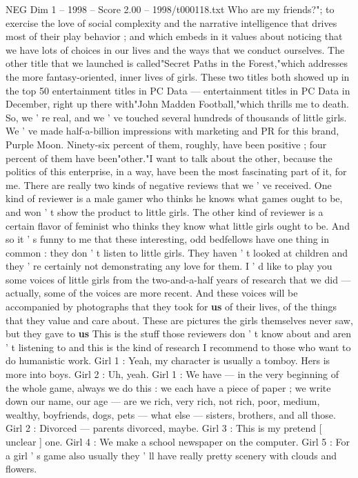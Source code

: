 \begin{textsample}{NEG Dim 1 – 1998 – Score 2.00 – 1998/t000118.txt}
Who are my friends?"; to exercise the love of social complexity and the narrative intelligence that drives most of their play behavior ; and which embeds in it values about noticing that we have lots of choices in our lives and the ways that we conduct ourselves.
The other title that we launched is called"Secret Paths in the Forest,"which addresses the more fantasy-oriented, inner lives of girls.
These two titles both showed up in the top 50 entertainment titles in PC Data — entertainment titles in PC Data in December, right up there with"John Madden Football,"which thrills me to death.
So, we ' re real, and we ' ve touched several hundreds of thousands of little girls.
We ' ve made half-a-billion impressions with marketing and PR for this brand, Purple Moon.
Ninety-six percent of them, roughly, have been positive ; four percent of them have been"other."I want to talk about the other, because the politics of this enterprise, in a way, have been the most fascinating part of it, for me.
There are really two kinds of negative reviews that we ' ve received.
One kind of reviewer is a male gamer who thinks he knows what games ought to be, and won ' t show the product to little girls.
The other kind of reviewer is a certain flavor of feminist who thinks they know what little girls ought to be.
And so it ' s funny to me that these interesting, odd bedfellows have one thing in common : they don ' t listen to little girls.
They haven ' t looked at children and they ' re certainly not demonstrating any love for them.
I ' d like to play you some voices of little girls from the two-and-a-half years of research that we did — actually, some of the voices are more recent.
And these voices will be accompanied by photographs that they took for \textbf{us} of their lives, of the things that they value and care about.
These are pictures the girls themselves never saw, but they gave to \textbf{us} This is the stuff those reviewers don ' t know about and aren ' t listening to and this is the kind of research I recommend to those who want to do humanistic work.
Girl 1 : Yeah, my character is usually a tomboy.
Hers is more into boys.
Girl 2 : Uh, yeah.
Girl 1 : We have — in the very beginning of the whole game, always we do this : we each have a piece of paper ; we write down our name, our age — are we rich, very rich, not rich, poor, medium, wealthy, boyfriends, dogs, pets — what else — sisters, brothers, and all those.
Girl 2 : Divorced — parents divorced, maybe.
Girl 3 : This is my pretend [ unclear ] one.
Girl 4 : We make a school newspaper on the computer.
Girl 5 : For a girl ' s game also usually they ' ll have really pretty scenery with clouds and flowers.

\end{textsample}
